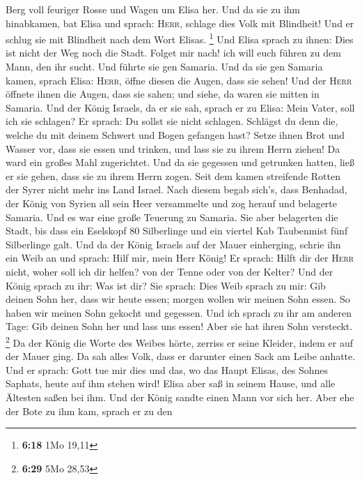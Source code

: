 Berg voll feuriger Rosse und Wagen um Elisa her.  Und da
sie zu ihm hinabkamen, bat Elisa und sprach: \textsc{Herr}, schlage dies
Volk mit Blindheit! Und er schlug sie mit Blindheit nach dem Wort
Elisas. \footnote{\textbf{6:18} 1Mo 19,11}  Und Elisa
sprach zu ihnen: Dies ist nicht der Weg noch die Stadt. Folget mir nach!
ich will euch führen zu dem Mann, den ihr sucht. Und führte sie gen
Samaria.  Und da sie gen Samaria kamen, sprach Elisa:
\textsc{Herr}, öffne diesen die Augen, dass sie sehen! Und der
\textsc{Herr} öffnete ihnen die Augen, dass sie sahen; und siehe, da
waren sie mitten in Samaria.  Und der König Israels, da
er sie sah, sprach er zu Elisa: Mein Vater, soll ich sie schlagen?
 Er sprach: Du sollst sie nicht schlagen. Schlägst du
denn die, welche du mit deinem Schwert und Bogen gefangen hast? Setze
ihnen Brot und Wasser vor, dass sie essen und trinken, und lass sie zu
ihrem Herrn ziehen!  Da ward ein großes Mahl zugerichtet.
Und da sie gegessen und getrunken hatten, ließ er sie gehen, dass sie zu
ihrem Herrn zogen. Seit dem kamen streifende Rotten der Syrer nicht mehr
ins Land Israel.  Nach diesem begab sich's, dass
Benhadad, der König von Syrien all sein Heer versammelte und zog herauf
und belagerte Samaria.  Und es war eine große Teuerung zu
Samaria. Sie aber belagerten die Stadt, bis dass ein Eselskopf 80
Silberlinge und ein viertel Kab Taubenmist fünf Silberlinge galt.
 Und da der König Israels auf der Mauer einherging,
schrie ihn ein Weib an und sprach: Hilf mir, mein Herr König!
 Er sprach: Hilft dir der \textsc{Herr} nicht, woher soll
ich dir helfen? von der Tenne oder von der Kelter?  Und
der König sprach zu ihr: Was ist dir? Sie sprach: Dies Weib sprach zu
mir: Gib deinen Sohn her, dass wir heute essen; morgen wollen wir meinen
Sohn essen.  So haben wir meinen Sohn gekocht und
gegessen. Und ich sprach zu ihr am anderen Tage: Gib deinen Sohn her und
lass uns essen! Aber sie hat ihren Sohn versteckt. \footnote{\textbf{6:29}
  5Mo 28,53}  Da der König die Worte des Weibes hörte,
zerriss er seine Kleider, indem er auf der Mauer ging. Da sah alles
Volk, dass er darunter einen Sack am Leibe anhatte.  Und
er sprach: Gott tue mir dies und das, wo das Haupt Elisas, des Sohnes
Saphats, heute auf ihm stehen wird!  Elisa aber saß in
seinem Hause, und alle Ältesten saßen bei ihm. Und der König sandte
einen Mann vor sich her. Aber ehe der Bote zu ihm kam, sprach er zu den
